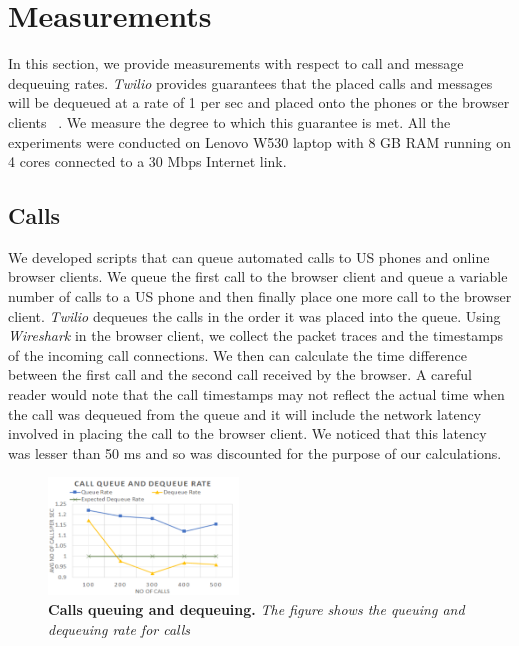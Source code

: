 \section{Measurements}
\label{sec-measurements}

In this section, we provide measurements with respect to call and message dequeuing rates. \textit{Twilio} provides guarantees that the placed calls and messages will be dequeued at a rate of 1 per sec and placed onto the phones or the browser clients ~\cite{guaranteelink}. We measure the degree to which this guarantee is met. All the experiments were conducted on Lenovo W530 laptop with 8 GB RAM running on 4 cores connected to a 30 Mbps Internet link.

\subsection{Calls}
\label{sec-measurements-calls}
We developed scripts that can queue automated calls to US phones and online browser clients. We queue the first call to the browser client and queue a variable number of calls to a US phone and then finally place one more call to the browser client. \textit{Twilio} dequeues the calls in the order it was placed into the queue. Using \textit{Wireshark} in the browser client, we collect the packet traces and the timestamps of the incoming call connections. We then can calculate the time difference between the first call and the second call received by the browser. A careful reader would note that the call timestamps may not reflect the actual time when the call was dequeued from the queue and it will include the network latency involved in placing the call to the browser client. We noticed that this latency was lesser than 50 ms and so was discounted for the purpose of our calculations. 

\begin{figure} \centering
\includegraphics[width=0.45\textwidth]{graphs/calls.pdf}
\caption{\textbf{Calls queuing and dequeuing.} {\footnotesize\textit{
The figure shows the queuing and dequeuing rate for calls
}}}
\label{fig:calls}
\end{figure}

